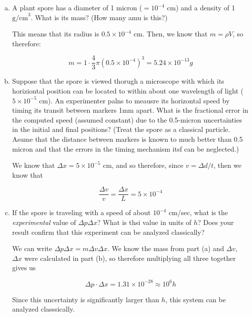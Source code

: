 \documentclass[10pt]{article}
\begin{document}
    \begin{enumerate}[(a)]
        \item A plant spore has a diameter of 1 micron ($=10^{-4}$ cm) and a density of 1 $\text{g/cm}^3$. What is its mass? (How many amu is this?) 

        \begin{solution}
            This means that its radius is $0.5 \times 10^{-4}$ cm. Then, we know that $m = \rho V$, so therefore: 

            \[ m = 1 \cdot \frac 43 \pi (0.5 \times 10^{-4})^3 = 5.24 \times 10^{-13} g\] 
        \end{solution}

        \item Suppose that the spore is viewed thorugh a microscope with which its horiziontal position can be located to within about one wavelength of light ($5 \times 10^{-5}$ cm). An experimenter palns to meausre its horizontal speed by timing its transit between markers 1mm apart. What is the fractional error in the computed speed (assumed constant) due to the 0.5-micron uncertainties in the initial and final positions? (Treat the spore as a classical particle. Asume that the distance between markers is known to much better than 0.5 micron and that the errors in the timing mechanism itsf can be neglected.)
        \begin{solution}
            We know that $\Delta x = 5 \times 10^{-5}$ cm, and so therefore, since $v = \Delta d/t$, then we know that 

            \[ \frac{\Delta v}{v} = \frac{\Delta x}{L} = 5 \times 10^{-4}\]
        \end{solution}

        \item If the spore is traveling with a speed of about $10^{-4}$ cm/sec, what is the \textit{experimental} value of $\Delta p \Delta x$? What is thsi value in units of $h$? Does your result confirm that this experiment can be analyzed classically? 
        
        \begin{solution}
            We can write $\Delta p \Delta x = m \Delta v \Delta x$. We know the mass from part (a) and $\Delta v$, $\Delta x$ were calculated in part (b), so therefore multiplying all three together gives us 

            \[ \Delta p \cdot \Delta x = 1.31 \times 10^{-28} \approx 10^6 h\]

            Since this uncertainty is significantly larger than $h$, this system can be analyzed classsically.
        \end{solution}


\end{enumerate}
\end{document}
